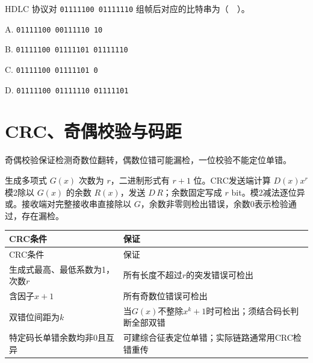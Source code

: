 HDLC 协议对 \texttt{01111100 01111110} 组帧后对应的比特串为（　）。

A. \texttt{01111100 00111110 10}

B. \texttt{01111100 01111101 01111110}

C. \texttt{01111100 01111101 0}

D. \texttt{01111100 01111110 01111101}

\section{CRC、奇偶校验与码距}\label{CN03-error-code}

奇偶校验保证检测奇数位翻转，偶数位错可能漏检，一位校验不能定位单错。

生成多项式 \(G(x)\) 次数为 \(r\)，二进制形式有 \(r+1\) 位。CRC发送端计算 \(D(x)x^r\) 模2除以 \(G(x)\) 的余数 \(R(x)\)，发送 \(D\,R\)；余数固定写成 \(r\) bit。模2减法逐位异或。接收端对完整接收串直接除以 \(G\)，余数非零则检出错误，余数0表示检验通过，存在漏检。

\par\smallskip
\begin{wideblock}
{\fontsize{9.3}{12}\selectfont\setlength{\tabcolsep}{2.5pt}\setlength{\LTleft}{0pt}\setlength{\LTright}{0pt}
\begin{longtable}{@{}>{\raggedright\arraybackslash}p{}>{\raggedright\arraybackslash}p{}@{}}
\toprule
CRC条件 & 保证 \\

\midrule\endfirsthead\toprule
CRC条件 & 保证 \\

\midrule\endhead\bottomrule\endfoot
生成式最高、最低系数为1，次数\(r\) & 所有长度不超过\(r\)的突发错误可检出 \\

含因子\(x+1\) & 所有奇数位错误可检出 \\

双错位间距为\(k\) & 当\(G(x)\)不整除\(x^k+1\)时可检出；须结合码长判断全部双错 \\

特定码长单错余数均非0且互异 & 可建综合征表定位单错；实际链路通常用CRC检错重传 \\

\end{longtable}}
\end{wideblock}
\par\smallskip

